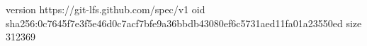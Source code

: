 version https://git-lfs.github.com/spec/v1
oid sha256:0c7645f7e3f5e46d0c7acf7bfe9a36bbdb43080ef6c5731aed11fa01a23550ed
size 312369
